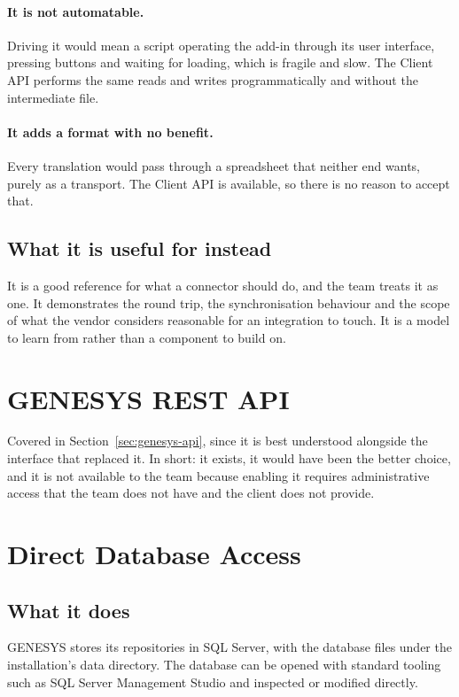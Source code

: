 \paragraph{It is not automatable.}
Driving it would mean a script operating the add-in through its user interface,
pressing buttons and waiting for loading, which is fragile and slow. The Client
API performs the same reads and writes programmatically and without the
intermediate file.

\paragraph{It adds a format with no benefit.}
Every translation would pass through a spreadsheet that neither end wants, purely
as a transport. The Client API is available, so there is no reason to accept
that.

\subsection{What it is useful for instead}

It is a good reference for what a connector should do, and the team treats it as
one. It demonstrates the round trip, the synchronisation behaviour and the scope
of what the vendor considers reasonable for an integration to touch. It is a model
to learn from rather than a component to build on.

\section{GENESYS REST API}

Covered in Section~\ref{sec:genesys-api}, since it is best understood alongside
the interface that replaced it. In short: it exists, it would have been the
better choice, and it is not available to the team because enabling it requires
administrative access that the team does not have and the client does not
provide.

\section{Direct Database Access}

\subsection{What it does}

GENESYS stores its repositories in SQL Server, with the database files under the
installation's data directory. The database can be opened with standard tooling
such as SQL Server Management Studio and inspected or modified directly.

